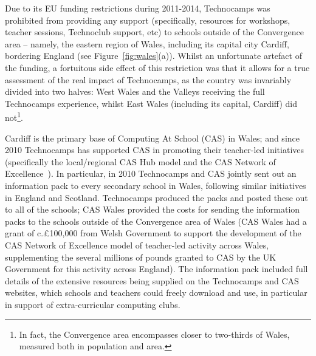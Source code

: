 \documentclass{sig-alternate}
\begin{document}
Due to its EU funding restrictions during 2011-2014, Technocamps was
prohibited from providing any support (specifically, resources for
workshops, teacher sessions, Technoclub support, etc) to schools
outside of the Convergence area -- namely, the eastern region of
Wales, including its capital city Cardiff, bordering England (see
Figure~\ref{fig:wales}(a)). Whilst an unfortunate artefact of the
funding, a fortuitous side effect of this restriction was that it
allows for a true assessment of the real impact of Technocamps, as the
country was invariably divided into two halves: West Wales and the
Valleys receiving the full Technocamps experience, whilst East Wales
(including its capital, Cardiff) did not\footnote{In fact, the
Convergence area encompasses closer to two-thirds of Wales, measured
both in population and area.}.

Cardiff is the primary base of Computing At School (CAS) in Wales;
and since 2010 Technocamps has supported CAS
in promoting their teacher-led initiatives
(specifically the local/regional CAS Hub model and the CAS Network of
Excellence~\cite{brown-et-al-toce2014,sentance-et-al-wipsce2014}).
In particular, in 2010 Technocamps and CAS jointly sent out an
information pack to every secondary school in Wales, following similar
initiatives in England and Scotland. Technocamps produced the packs
and posted these out to all of the schools; CAS Wales provided the
costs for sending the information packs to the schools outside of the
Convergence area of Wales (CAS Wales had a grant of c.\pounds100,000
from Welsh Government to support the development of the CAS Network of
Excellence model of teacher-led activity across Wales, supplementing
the several millions of pounds granted to CAS by the UK Government for
this activity across England).  The information pack included full
details of the extensive resources being supplied on the Technocamps
and CAS websites, which schools and teachers could freely download and
use, in particular in support of extra-curricular computing clubs.

 
\end{document}
